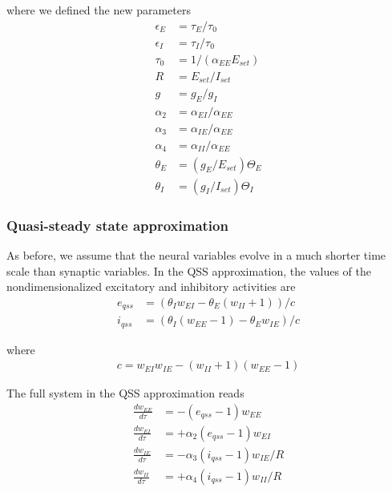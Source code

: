 \documentclass[
twocolumn,
]{article}
\newcommand{\EE}{\mathit{EE}}
\newcommand{\EI}{\mathit{EI}}
\newcommand{\IE}{\mathit{IE}}
\newcommand{\II}{\mathit{II}}
\newcommand{\set}{\mathit{set}}
\newcommand{\qss}{\mathit{qss}}
\begin{document}
\noindent where we defined the new parameters
\begin{displaymath}
\begin{aligned}
\epsilon_E & = \tau_E/\tau_0 \\
\epsilon_I & = \tau_I/\tau_0 \\
\tau_0 & = 1/(\alpha_{\EE} E_{\set}) \\
R & = E_{\set}/I_{\set} \\
g & = g_E/g_I \\
\alpha_2 & = \alpha_{\EI}/\alpha_{\EE} \\
\alpha_3 & = \alpha_{\IE}/\alpha_{\EE} \\
\alpha_4 & = \alpha_{\II}/\alpha_{\EE} \\
\theta_E & = (g_E/E_{\set}) \Theta_E \\
\theta_I & = (g_I/I_{\set}) \Theta_I
\end{aligned}
\end{displaymath}



\subsubsection{Quasi-steady state approximation}

As before, we assume that the neural variables evolve in a much shorter time scale than synaptic variables. In the QSS approximation, the values of the nondimensionalized excitatory and inhibitory activities are
\begin{equation}
\begin{aligned}
e_{\qss} & = (\theta_I w_{\EI} - \theta_E(w_{\II} + 1))/c \\
i_{\qss} & = (\theta_I (w_{\EE} - 1) - \theta_E w_{\IE})/c
\end{aligned}
\label{eq.SS_upstate_qss}
\end{equation}

\noindent where
\begin{displaymath}
\begin{aligned}
c = w_{\EI} w_{\IE} - (w_{\II} + 1)(w_{\EE} - 1)
\end{aligned}
\end{displaymath}

The full system in the QSS approximation reads
\begin{equation}
\begin{aligned}
\frac{dw_{\EE}}{d\tau} & = -(e_{\qss} - 1)w_{\EE} \\
\frac{dw_{\EI}}{d\tau} & = +\alpha_2(e_{\qss} - 1)w_{\EI} \\
\frac{dw_{\IE}}{d\tau} & = -\alpha_3(i_{\qss}-1)w_{\IE}/R \\
\frac{dw_{\II}}{d\tau} & = +\alpha_4(i_{\qss}-1)w_{\II}/R
\end{aligned}
\label{eq.SS_full_norm_qss}
\end{equation}
\end{document}
